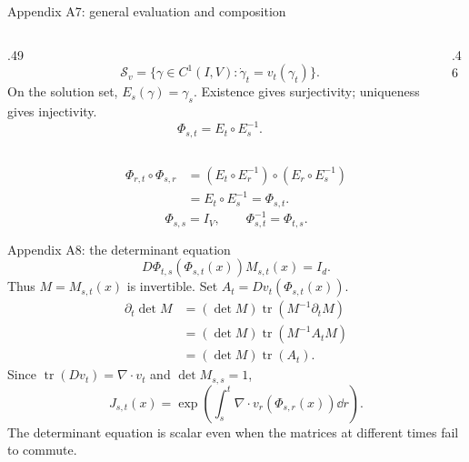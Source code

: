 \begin{frame}[t]{Appendix A7: general evaluation and composition}
\hypertarget{app:general}{}
\begin{columns}[T,onlytextwidth]
  \begin{column}{.49\textwidth}
    \begin{equation*}
      \mathcal S_v=\{\gamma\in C^1(I,V):\dot\gamma_t=v_t(\gamma_t)\}.
    \end{equation*}
    On the solution set, $E_s(\gamma)=\gamma_s$.
    Existence gives surjectivity; uniqueness gives injectivity.
    \begin{equation*}
      \Phi_{s,t}=E_t\circ E_s^{-1}.
    \end{equation*}
  \end{column}
  \begin{column}{.46\textwidth}
  \end{column}
\end{columns}
\begin{equation*}
  \begin{aligned}
    \Phi_{r,t}\circ\Phi_{s,r}
      &=(E_t\circ E_r^{-1})\circ(E_r\circ E_s^{-1})\\
      &=E_t\circ E_s^{-1}=\Phi_{s,t}.
  \end{aligned}
\end{equation*}
\begin{equation*}
  \Phi_{s,s}=I_V,\qquad \Phi_{s,t}^{-1}=\Phi_{t,s}.
\end{equation*}
\end{frame}

\begin{frame}[t]{Appendix A8: the determinant equation}
\hypertarget{app:jacobian}{}
\begin{equation*}
  D\Phi_{t,s}(\Phi_{s,t}(x))M_{s,t}(x)=I_d.
\end{equation*}
Thus $M=M_{s,t}(x)$ is invertible. Set $A_t=Dv_t(\Phi_{s,t}(x))$.
\begin{equation*}
  \begin{aligned}
    \partial_t\det M
      &=(\det M)\operatorname{tr}(M^{-1}\partial_tM)\\
      &=(\det M)\operatorname{tr}(M^{-1}A_tM)\\
      &=(\det M)\operatorname{tr}(A_t).
  \end{aligned}
\end{equation*}
Since $\operatorname{tr}(Dv_t)=\nabla\cdot v_t$ and $\det M_{s,s}=1$,
\begin{equation*}
  J_{s,t}(x)=\exp\!\left(\int_s^t\nabla\cdot v_r(\Phi_{s,r}(x))\dd r\right).
\end{equation*}
The determinant equation is scalar even when the matrices at different times fail to commute.
\end{frame}


